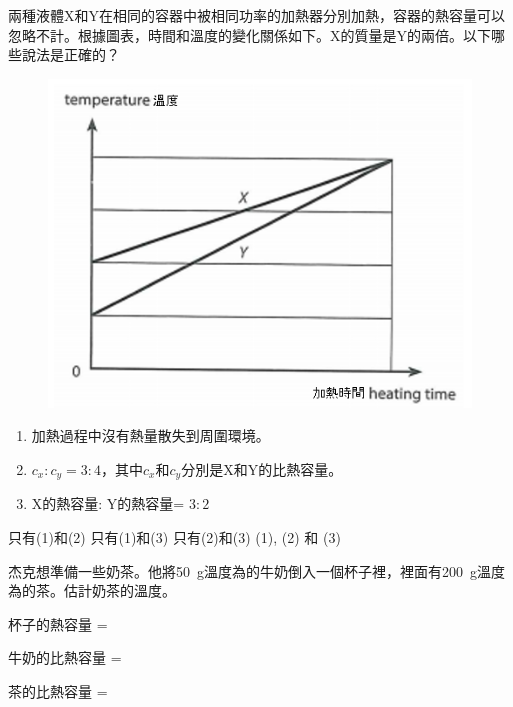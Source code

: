 {
    兩種液體X和Y在相同的容器中被相同功率的加熱器分別加熱，容器的熱容量可以忽略不計。根據圖表，時間和溫度的變化關係如下。X的質量是Y的兩倍。以下哪些說法是正確的？
    \begin{figure}[h]
        \centering
        \includegraphics[width=0.5\linewidth]{assets/16.png}
    \end{figure}
    \begin{enumerate}[label=\sd]
        \item 加熱過程中沒有熱量散失到周圍環境。
        \item $c_x: c_y=3:4$，其中$c_x$和$c_y$分別是X和Y的比熱容量。
        \item X的熱容量: Y的熱容量= $3:2$
    \end{enumerate}
    \begin{choices}
        \choice 只有(1)和(2)
        \choice 只有(1)和(3)
        \choice 只有(2)和(3)
        \CorrectChoice (1), (2) 和 (3)
    \end{choices}
}{}

{
    杰克想準備一些奶茶。他將\qty{50}{g}溫度為的牛奶倒入一個杯子裡，裡面有\qty{200}{g}溫度為的茶。估計奶茶的溫度。
    \par 杯子的熱容量 = 
    \par 牛奶的比熱容量 = 
    \par 茶的比熱容量  = 

    \begin{choices}
        \choice {}
        \choice {}
        \choice {}
        \CorrectChoice {}
    \end{choices}
}{}

